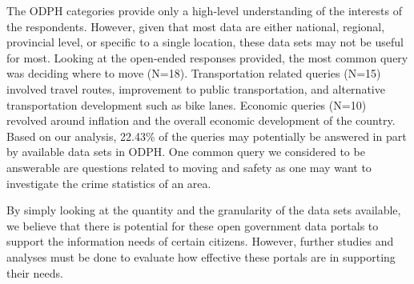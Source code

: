 \documentclass{sigchi}
\begin{document}
The ODPH categories provide only a high-level understanding of the interests of the respondents. However, given that most data are either national, regional, provincial level, or specific to a single location, these data sets may not be useful for most. Looking at the open-ended responses provided, the most common query was deciding where to move (N=18). Transportation related queries (N=15) involved travel routes, improvement to public transportation, and alternative transportation development such as bike lanes. Economic queries (N=10) revolved around inflation and the overall economic development of the country. Based on our analysis, 22.43\% of the queries may potentially be answered in part by available data sets in ODPH. One common query we considered to be answerable are questions related to moving and safety as one may want to investigate the crime statistics of an area. 

By simply looking at the quantity and the granularity of the data sets available, we believe that there is potential for these open government data portals to support the information needs of certain citizens. However, further studies and analyses must be done to evaluate how effective these portals are in supporting their needs. 
\end{document}
